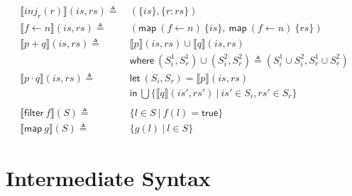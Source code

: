 \documentclass[12pt, letterpaper]{article}
\newcommand\interp[1]{\llbracket #1 \rrbracket}
\begin{document}
\begin{align*}
      \\
    \interp { inj_{r}(r) }(\mathit{is}, \mathit{rs})
      \triangleq\ &
      (\{\mathit{is}\},\{ \mathit{r : rs}\})
      \\
    \interp { f \leftarrow n }(is, rs)
      \triangleq\ &
      (\mathsf{map}\ (f\leftarrow n)\ \{is\},\
       \mathsf{map}\ (f\leftarrow n)\ \{rs\})
      \\ %
    \interp { p + q }(\mathit{is}, \mathit{rs})
      \triangleq\ &
      \interp { p }(\mathit{is}, \mathit{rs})\cup
      \interp { q }(\mathit{is}, \mathit{rs}) \\
      &\mathsf{where}\ (S_i^1, S_r^1)\cup (S_i^2, S_r^2)\triangleq
        (S_i^1\cup S_i^2, S_r^1\cup S_r^2)\\
    \interp { p \cdot q }(\mathit{is}, \mathit{rs})
      \triangleq\ &
      \mathsf{let}\ (S_i, S_r) = \interp{p}(is, rs)\\
      &\mathsf{in}\ \bigcup \{\interp{q}(\mathit{is}',\mathit{rs}')\ |\ \mathit{is}'\in S_i, \mathit{rs'}\in S_r\}\\
      \\
    \interp{\mathsf{filter}\ f}(S)
      \triangleq\ & \{l \in S\ |\ f(l) = \mathsf{true}\}\\
    \interp{\mathsf{map}\ g}(S)
      \triangleq\ &
      \{ g(l)\ |\ l\in S \} 
  \end{align*}


  \cleardoublepage
  \section{Intermediate Syntax}\label{sec:isyn}
\end{document}

